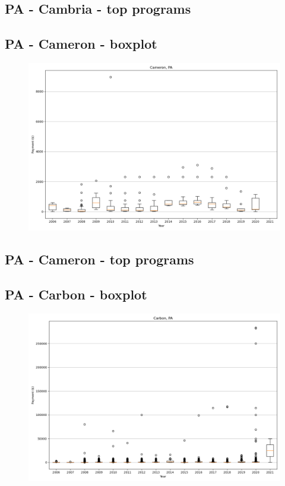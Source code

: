 \subsection*{PA - Cambria - top programs}

\newpage
\subsection*{PA - Cameron - boxplot}
\begin{figure}[h]
\centering
\includegraphics[width=7in]{../output/boxplots/counties/Cameron-PA_boxplot.png}
\end{figure}


\subsection*{PA - Cameron - top programs}

\newpage
\subsection*{PA - Carbon - boxplot}
\begin{figure}[h]
\centering
\includegraphics[width=7in]{../output/boxplots/counties/Carbon-PA_boxplot.png}
\end{figure}


